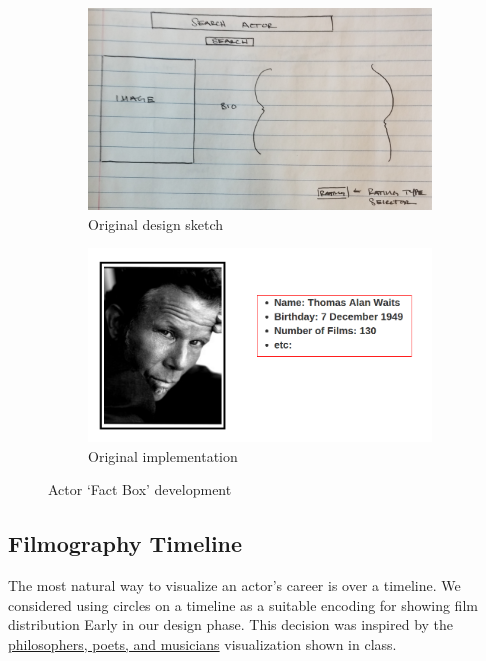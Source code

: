 \documentclass[12pt]{article}
\begin{document}
		\begin{figure}[h!]
			\centering
			\begin{subfigure}[t]{.5\textwidth}
				  \centering
				  \includegraphics[width=\linewidth]{images/actorFactBox_crop.png}
				  \caption{Original design sketch}
				  \label{fig:sub1}
			\end{subfigure}%
			\begin{subfigure}[t]{.5\textwidth}
				  \centering
				  \includegraphics[width=.8\linewidth]{images/actorBox.png}
				  \caption{Original implementation}
				  \label{fig:sub2}
			\end{subfigure}%
			\caption{Actor `Fact Box' development}
			\label{fig:actorFactBox}
		\end{figure}


\subsection{Filmography Timeline}


The most natural way to visualize an actor's career is over a timeline.  We considered using circles on a timeline as a suitable encoding for showing film distribution Early in our design phase.  This decision was inspired by the \href{http://mariandoerk.de/edgemaps/demo/#phils;time;;;}{philosophers, poets, and musicians}  visualization shown in class. 
\end{document}

